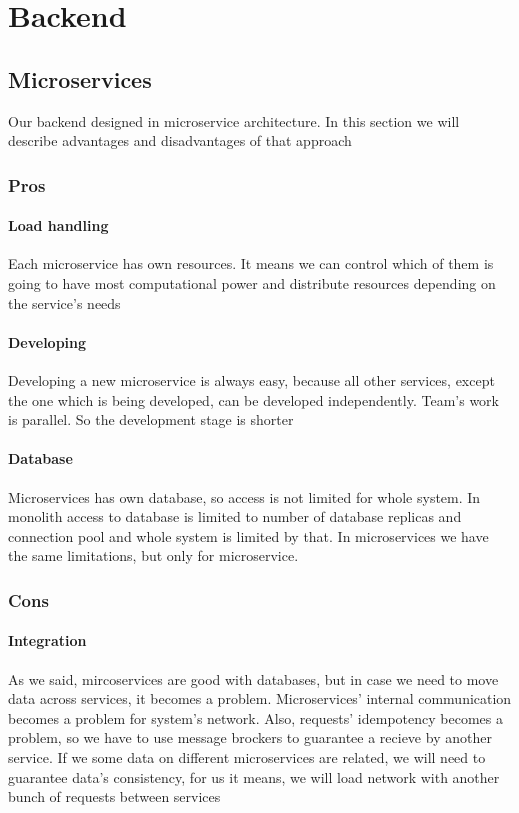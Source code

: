 \chapter{Backend}\label{ch:A}
\section{Microservices}
Our backend designed in microservice architecture. In this section we will describe advantages and disadvantages of that approach
	\subsection{Pros}
		\subsubsection{Load handling}
		Each microservice has own resources. It means we can control which of them is going to have most computational power and distribute resources depending on the service's needs
		\subsubsection{Developing}
		Developing a new microservice is always easy, because all other services, except the one which is being developed, can be developed independently. Team's work is parallel. So the development stage is shorter
		\subsubsection{Database}
		Microservices has own database, so access is not limited for whole system. In monolith access to database is limited to number of database replicas and connection pool and whole system is limited by that. In microservices we have the same limitations, but only for microservice.
	\subsection{Cons}
		\subsubsection{Integration}
		As we said, mircoservices are good with databases, but in case we need to move data across services, it becomes a problem. Microservices' internal communication becomes a problem for system's network. Also, requests' idempotency becomes a problem, so we have to use message brockers to guarantee a recieve by another service. If we some data on different microservices are related, we will need to guarantee data's consistency, for us it means, we will load network with another bunch of requests between services
